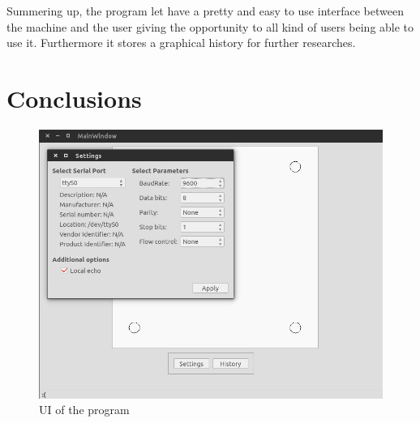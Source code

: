 		Summering up, the program let have a pretty and easy to use interface between the machine and the user giving the opportunity to all kind of users being able to use it. Furthermore it stores a graphical history for further researches.

	\section{Conclusions} %
	\label{sec:high_level_programming_conclusions}
	

		\begin{figure}[hb!]
			\begin{center}
				\includegraphics[width=.8\textwidth]{figures/UI}
			\end{center}
			\caption{UI of the program}
			\label{fig:ui}
		\end{figure}
